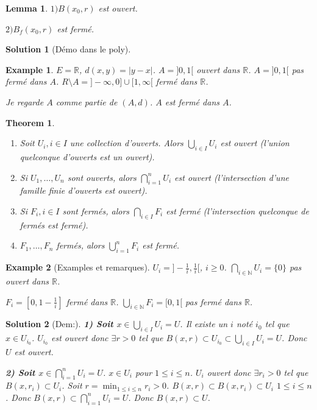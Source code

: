 \documentclass{article}
\newtheorem{theorem}{Theorem}
\newtheorem{lemma}{Lemma}
\newtheorem{solution}{Solution}
\newtheorem{example}{Example}
\begin{document}
\begin{lemma}
$1) B(x_0, r)$ est ouvert.

$2) B_f(x_0, r)$ est fermé.
\end{lemma}

\begin{solution}
[Démo dans le poly]
\end{solution}

\begin{example}
$E = \mathbb{R}$, $d(x, y) = |y - x|$.
$A = ]0, 1[$ ouvert dans $\mathbb{R}$.
$A = ]0, 1[$ pas fermé dans $A$.
$R \setminus A = ]-\infty, 0] \cup [1, \infty[$ fermé dans $\mathbb{R}$.

Je regarde $A$ comme partie de $(A, d)$.
$A$ est fermé dans $A$.
\end{example}

\begin{theorem}
\begin{enumerate}
    \item Soit $U_i, i \in I$ une collection d'ouverts. Alors $\bigcup_{i \in I} U_i$ est ouvert (l'union quelconque d'ouverts est un ouvert).
    \item Si $U_1, \dots, U_n$ sont ouverts, alors $\bigcap_{i=1}^n U_i$ est ouvert (l'intersection d'une famille finie d'ouverts est ouvert).
    \item Si $F_i, i \in I$ sont fermés, alors $\bigcap_{i \in I} F_i$ est fermé (l'intersection quelconque de fermés est fermé).
    \item $F_1, \dots, F_n$ fermés, alors $\bigcup_{i=1}^n F_i$ est fermé.
\end{enumerate}
\end{theorem}

\begin{example}
[Examples et remarques]
$U_i = ]-\frac{1}{i}, \frac{1}{i}[$, $i \geq 0$.
$\bigcap_{i \in \mathbb{N}} U_i = \{0\}$ pas ouvert dans $\mathbb{R}$.

$F_i = [0, 1 - \frac{1}{i}]$ fermé dans $\mathbb{R}$.
$\bigcup_{i \in \mathbb{N}} F_i = [0, 1[$ pas fermé dans $\mathbb{R}$.
\end{example}

\begin{solution}
[Dem:]
\textbf{1) Soit $x \in \bigcup_{i \in I} U_i = U$}. Il existe un $i$ noté $i_0$ tel que $x \in U_{i_0}$.
$U_{i_0}$ est ouvert donc $\exists r > 0$ tel que $B(x, r) \subset U_{i_0} \subset \bigcup_{i \in I} U_i = U$. Donc $U$ est ouvert.

\textbf{2) Soit $x \in \bigcap_{i=1}^n U_i = U$}. $x \in U_i$ pour $1 \leq i \leq n$. $U_i$ ouvert donc $\exists r_i > 0$ tel que $B(x, r_i) \subset U_i$.
Soit $r = \min_{1 \leq i \leq n} r_i > 0$.
$B(x, r) \subset B(x, r_i) \subset U_i$ $1 \leq i \leq n$.
Donc $B(x, r) \subset \bigcap_{i=1}^n U_i = U$.
Donc $B(x, r) \subset U$.
\end{solution}
\end{document}
